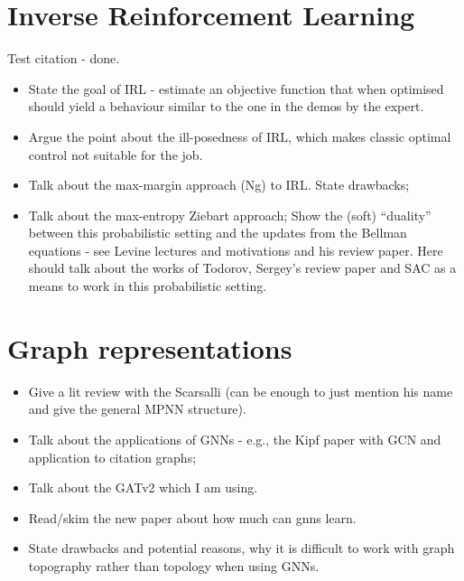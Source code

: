 \documentclass{report}
\numberwithin{equation}{section}
\numberwithin{figure}{section}
\numberwithin{table}{section}
\begin{document}
\chapter{Inverse Reinforcement Learning}
Test citation \citep{NgIRL} - done.
\begin{itemize}
  \item State the goal of IRL - estimate an objective function
    that when optimised should yield a behaviour similar to the 
    one in the demos by the expert.
  \item Argue the point about the ill-posedness of IRL, which makes 
    classic optimal control not suitable for the job.
  \item Talk about the max-margin approach (Ng) to IRL.
    State drawbacks;
  \item Talk about the max-entropy Ziebart approach;
    Show the (soft) ``duality'' between this probabilistic setting and 
    the updates from the Bellman equations - see Levine lectures 
    and motivations and his review paper. Here should talk about the 
    works of Todorov, Sergey's review paper and SAC as a means to 
    work in this probabilistic setting.
\end{itemize}

\chapter{Graph representations}
\begin{itemize}
  \item Give a lit review with the Scarsalli (can be enough to just 
  mention his name and give the general MPNN structure).
  \item Talk about the applications of GNNs - e.g., the Kipf paper 
    with GCN and application to citation graphs;
  \item Talk about the GATv2 which I am using.
  \item Read/skim the new paper about how much can gnns learn.
  \item State drawbacks and potential reasons, why it is difficult 
    to work with graph topography rather than topology when using 
    GNNs.
\end{itemize}

\end{document}
